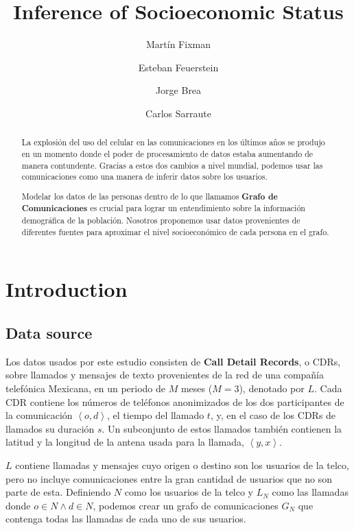 \documentclass{llncs}
\title{Inference of Socioeconomic Status}
\author{
	Martín Fixman\inst{1}
\and
	Esteban Feuerstein\inst{1}
\and 
    Jorge Brea\inst{2}
\and
	Carlos Sarraute\inst{2}
}
\institute{
	Universidad de Buenos Aires, Argentina
\and
    Grandata Labs
}
\begin{document}
\maketitle

\begin{abstract}

La explosión del uso del celular en las comunicaciones en los últimos años se produjo en un momento donde el poder de procesamiento de datos estaba aumentando de manera contundente. Gracias a estos dos cambios a nivel mundial, podemos usar las comunicaciones como una manera de inferir datos sobre los usuarios.

Modelar los datos de las personas dentro de lo que llamamos \textbf{Grafo de Comunicaciones} es crucial para lograr un entendimiento sobre la información demográfica de la población. Nosotros proponemos usar datos provenientes de diferentes fuentes para aproximar el nivel socioeconómico de cada persona en el grafo.

\end{abstract}

\section{Introduction}


\subsection{Data source}

Los datos usados por este estudio consisten de \textbf{Call Detail Records}, o CDRs, sobre llamados y mensajes de texto provenientes de la red de una compañía telefónica Mexicana, en un periodo de \( M \) meses (\( M = 3 \)), denotado por \( L \). Cada CDR contiene los números de teléfonos anonimizados de los dos participantes de la comunicación \(\left<o, d\right>\), el tiempo del llamado \(t\), y, en el caso de los CDRs de llamados su duración \(s\). Un subconjunto de estos llamados también contienen la latitud y la longitud de la antena usada para la llamada, \(\left<y, x\right>\).

\( L \) contiene llamadas y mensajes cuyo origen o destino son los usuarios de la telco, pero no incluye comunicaciones entre la gran cantidad de usuarios que no son parte de esta. Definiendo \( N \) como los usuarios de la telco y \( L_N \) como las llamadas donde \( o \in N \wedge d \in N \), podemos crear un grafo de comunicaciones \( G_N \) que contenga todas las llamadas de cada uno de sus usuarios.
\end{document}

